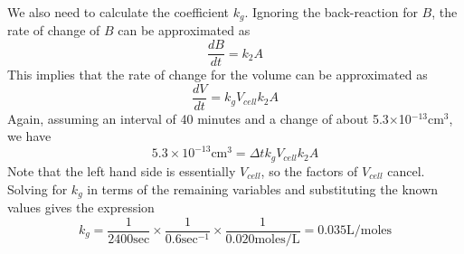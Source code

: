 \documentclass[12pt]{article}
\begin{document}
We also need to calculate the coefficient $k_g$.
Ignoring the back-reaction for $B$, the rate of change of $B$ can be approximated as
\[
\frac{dB}{dt} = k_2 A
\]
This implies that the rate of change for the volume can be approximated as
\[
\frac{dV}{dt} = k_g V_{cell}k_2 A
\]
Again, assuming an interval of 40 minutes and a change of about 5.3$\times$10$^{-13}$cm$^3$, we have
\[
5.3\times 10^{-13}\mbox{cm}^3 = \Delta t k_g V_{cell}k_2 A
\]
Note that the left hand side is essentially $V_{cell}$, so the factors of $V_{cell}$ cancel.
Solving for $k_g$ in terms of the remaining variables and substituting the known values gives
the expression
\[
k_g = \frac{1}{2400\mbox{sec}} \times\frac{1}{0.6\mbox{sec}^{-1}}\times\frac{1}{0.020\mbox{moles/L}}
=0.035\mbox{L/moles}
\]
\end{document}
